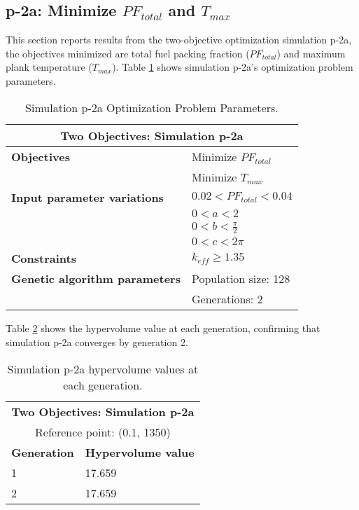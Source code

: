 \subsection{p-2a: Minimize $PF_{total}$ and $T_{max}$}
\label{sec:p-2a}
This section reports results from the two-objective optimization simulation p-2a, the 
objectives minimized are total fuel packing fraction ($PF_{total}$) and maximum plank
temperature ($T_{max}$).  
Table \ref{tab:simulationp2a} shows simulation p-2a's optimization problem parameters.
\begin{table}[htbp!]
    \centering
    \onehalfspacing
    \caption{Simulation p-2a Optimization Problem Parameters.}
	\label{tab:simulationp2a}
    \footnotesize
    \begin{tabular}{l|p{4cm}}
    \hline 
    \multicolumn{2}{c}{\textbf{Two Objectives: Simulation p-2a}} \\
    \hline 
    \textbf{Objectives} & Minimize $PF_{total}$ \\
    & Minimize $T_{max}$ \\
    \hline 
    \textbf{Input parameter variations} & $0.02<PF_{total}<0.04$ \\
    & $0<a<2$ \\
    & $0<b<\frac{\pi}{2}$ \\
    & $0<c<2\pi$ \\
    \hline
    \textbf{Constraints} & $k_{eff} \geq 1.35$\\ 
    \hline 
    \textbf{Genetic algorithm parameters} & Population size: 128 \\
    & Generations: 2 \\
    \hline
    \end{tabular}
\end{table}

Table \ref{tab:p2a-hypervolume} shows the hypervolume value at each generation, 
confirming that simulation p-2a converges by generation 2. 
\begin{table}[htbp!]
    \centering
    \onehalfspacing
    \caption{Simulation p-2a hypervolume values at each generation.}
	\label{tab:p2a-hypervolume}
    \footnotesize
    \begin{tabular}{ll}
    \hline 
    \multicolumn{2}{c}{\textbf{Two Objectives: Simulation p-2a}} \\
    \multicolumn{2}{c}{Reference point: (0.1, 1350)} \\
    \hline 
    \textbf{Generation} & \textbf{Hypervolume value} \\
    \hline
    1 & 17.659 \\
    2 & 17.659 \\
    \hline
    \end{tabular}
\end{table}

